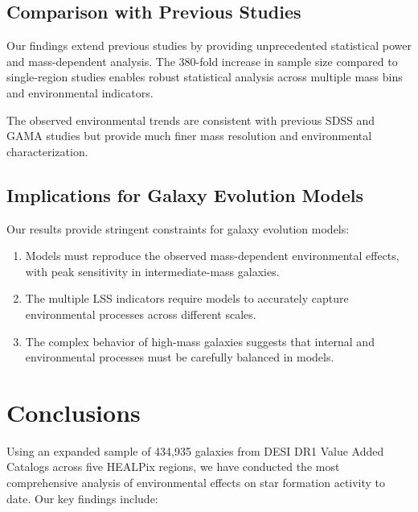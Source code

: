 \documentclass[twocolumn]{aastex701}
\begin{document}
\subsection{Comparison with Previous Studies}

Our findings extend previous studies by providing unprecedented statistical power and mass-dependent analysis. The 380-fold increase in sample size compared to single-region studies enables robust statistical analysis across multiple mass bins and environmental indicators.

The observed environmental trends are consistent with previous SDSS \citep{Peng2010} and GAMA \citep{Brough2013} studies but provide much finer mass resolution and environmental characterization.

\subsection{Implications for Galaxy Evolution Models}

Our results provide stringent constraints for galaxy evolution models:

\begin{enumerate}
\item Models must reproduce the observed mass-dependent environmental effects, with peak sensitivity in intermediate-mass galaxies.

\item The multiple LSS indicators require models to accurately capture environmental processes across different scales.

\item The complex behavior of high-mass galaxies suggests that internal and environmental processes must be carefully balanced in models.
\end{enumerate}

\section{Conclusions}

Using an expanded sample of 434,935 galaxies from DESI DR1 Value Added Catalogs across five HEALPix regions, we have conducted the most comprehensive analysis of environmental effects on star formation activity to date. Our key findings include:
\end{document}
